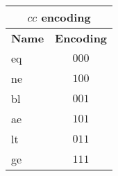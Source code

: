 \documentclass{scrartcl}
\begin{document}
\begin{table}
\begin{tabular}{lcrl}
    \bottomrule
  \end{tabular}
  \quad
  \begin{tabular}{lc}
    \multicolumn{2}{c}{\(cc\) encoding}\\
    \toprule
    \textbf{Name} & \textbf{Encoding}\\
    \midrule
    eq & \(000\)\\
    ne & \(100\)\\
    bl & \(001\)\\
    ae & \(101\)\\
    lt & \(011\)\\
    ge & \(111\)\\
    \bottomrule
  \end{tabular}

\end{table}
\end{document}
